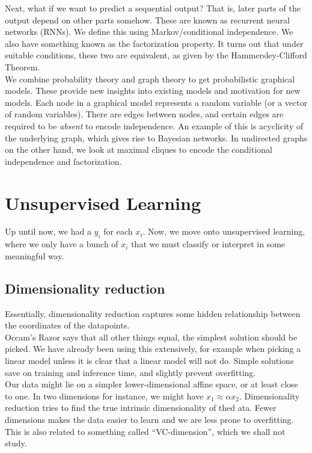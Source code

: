\documentclass{article}
\begin{document}
		Next, what if we want to predict a sequential output? That is, later parts of the output depend on other parts somehow. These are known as recurrent neural networks (RNNs). We define this using Markov/conditional independence. We also have something known as the factorization property. It turns out that under suitable conditions, these two are equivalent, as given by the Hammersley-Clifford Theorem. \\
		We combine probability theory and graph theory to get probabilistic graphical models. These provide new insights into existing models and motivation for new models. Each node in a graphical model represents a random variable (or a vector of random variables). There are edges between nodes, and certain edges are required to be \emph{absent} to encode independence. An example of this is acyclicity of the underlying graph, which gives rise to Bayesian networks. In undirected graphs on the other hand, we look at maximal cliques to encode the conditional independence and factorization. 




\clearpage

\section{Unsupervised Learning}

	Up until now, we had a $y_i$ for each $x_i$. Now, we move onto unsupervised learning, where we only have a bunch of $x_i$ that we must classify or interpret in some meaningful way.

	\subsection{Dimensionality reduction}

		Essentially, dimensionality reduction captures some hidden relationship between the coordinates of the datapoints.\\

		Occam's Razor says that all other things equal, the simplest solution should be picked. We have already been using this extensively, for example when picking a linear model unless it is clear that a linear model will not do. Simple solutions save on training and inference time, and slightly prevent overfitting.\\
		Our data might lie on a simpler lower-dimensional affine space, or at least close to one. In two dimensions for instance, we might have $x_1 \approx \alpha x_2$. Dimensionality reduction tries to find the true intrinsic dimensionality of thed ata. Fewer dimensions makes the data easier to learn and we are less prone to overfitting.\\
		This is also related to something called ``VC-dimension'', which we shall not study.\\
\end{document}
